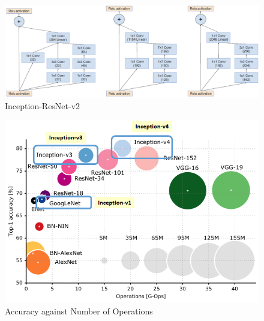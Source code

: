 \documentclass[presentation]{beamer}
\begin{document}
\begin{frame}[allowframebreaks]
    \begin{figure}
        \centering
        \includegraphics[width=\linewidth]{1_4.png}
        \caption{Inception-ResNet-v2}
    \end{figure}

    \begin{figure}
        \centering
        \includegraphics[width=0.8\linewidth]{1_5.png}
        \caption{Accuracy against Number of Operations}
    \end{figure}

\end{frame}
\end{document}
